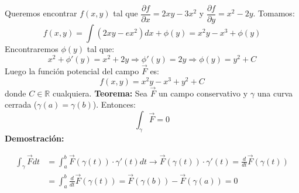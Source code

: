 \documentclass[11pt]{article}
\newcommand{\R}{\mathbb{R}}
\theoremstyle{plain}
\begin{document}
            Queremos encontrar $f(x,y)$ tal que $\dfrac{\partial f}{\partial x} = 2xy-3x^2$ y $\dfrac{\partial f}{\partial y} = x^2-2y$. Tomamos:
            \[f(x,y) = \int (2xy-ex^2) dx + \phi(y) = x^2 y -x^3 + \phi(y)\]
            Encontraremos $\phi(y)$ tal que:
            \[x^2 + \phi'(y) = x^2 + 2y \Rightarrow \phi'(y) = 2y \Rightarrow \phi(y) = y^2 + C \]
            Luego la función potencial del campo $\vec{F}$ es:
            \[f(x,y) = x^2 y -x^3 + y^2 + C\] donde $C\in \R$ cualquiera.
            \textbf{Teorema:} Sea $\vec{F}$ un campo conservativo y $\gamma$ una curva cerrada ($\gamma(a) = \gamma(b)$). Entonces:
            \[\int_\gamma \vec{F} = 0\]
            \textbf{Demostración:}

                \begin{align}
                    \int_\gamma \vec{F} dt&= \int_a^b \vec{F}(\gamma(t)) \cdot \gamma'(t)dt \rightarrow \vec{F}(\gamma(t)) \cdot \gamma'(t) = \frac{d}{dt} \vec{F}(\gamma(t))\\
                    &= \int_a^b \frac{d}{dt} \vec{F}(\gamma(t)) = \vec{F}(\gamma(b)) - \vec{F}(\gamma(a)) = 0
                \end{align} 


\end{document}
